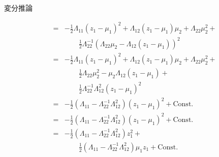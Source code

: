 \documentclass[dvipdfmx,notheorems,t]{beamer}
\begin{document}
\begin{frame}{変分推論}
\begin{itemize}
\begin{itemize}
\begin{eqnarray}
			&=& -\frac{1}{2} \Lambda_{11} (z_1 - \mu_1)^2 + \Lambda_{12} (z_1 - \mu_1) \mu_2 + \Lambda_{22} \mu_2^2 + \nonumber \\
			&& \qquad \frac{1}{2} \Lambda_{22}^{-1} \left( \Lambda_{22} \mu_2 - \Lambda_{12} (z_1 - \mu_1) \right)^2 \nonumber \\
			&=& -\frac{1}{2} \Lambda_{11} (z_1 - \mu_1)^2 + \Lambda_{12} (z_1 - \mu_1) \mu_2 + \Lambda_{22} \mu_2^2 + \nonumber \\
			&& \qquad \frac{1}{2} \Lambda_{22} \mu_2^2 - \mu_2 \Lambda_{12} (z_1 - \mu_1) + \nonumber \\
			&& \qquad \frac{1}{2} \Lambda_{22}^{-1} \Lambda_{12}^2 (z_1 - \mu_1)^2 \\
			&=& -\frac{1}{2} \left( \Lambda_{11} - \Lambda_{22}^{-1} \Lambda_{12}^2 \right) (z_1 - \mu_1)^2 + \mathrm{Const.} \nonumber \\
			&=& -\frac{1}{2} \left( \Lambda_{11} - \Lambda_{22}^{-1} \Lambda_{12}^2 \right) (z_1 - \mu_1)^2 + \mathrm{Const.} \\
			&=& -\frac{1}{2} \left( \Lambda_{11} - \Lambda_{22}^{-1} \Lambda_{12}^2 \right) z_1^2 + \nonumber \\
			&& \qquad \frac{1}{2} \left( \Lambda_{11} - \Lambda_{22}^{-1} \Lambda_{12}^2 \right) \mu_1 z_1 + \mathrm{Const.}
		\end{eqnarray}
	\end{itemize}
\end{itemize}

\end{frame}
\end{document}
